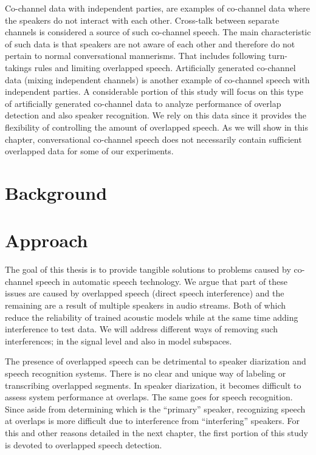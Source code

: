Co-channel data with independent parties, are examples of co-channel data where the speakers do not interact with each other. 
Cross-talk between separate channels is considered a source of such co-channel speech. 
The main characteristic of such data is that speakers are not aware of each other and therefore do not pertain to normal conversational mannerisms. 
That includes following turn-takings rules and limiting overlapped speech. 
Artificially generated co-channel data (mixing independent channels) is another example of co-channel speech with independent parties. 
A considerable portion of this study will focus on this type of artificially generated co-channel data to analyze performance of overlap detection and also speaker recognition. 
We rely on this data since it provides the flexibility of controlling the amount of overlapped speech. 
As we will show in this chapter, conversational co-channel speech does not necessarily contain sufficient overlapped data for some of our experiments. 

\section{Background}
\label{sec:background}



\section{Approach}

The goal of this thesis is to provide tangible solutions to problems caused by co-channel speech in automatic speech technology. 
We argue that part of these issues are caused by overlapped speech (direct speech interference) and the remaining are a result of multiple speakers in audio streams. 
Both of which reduce the reliability of trained acoustic models while at the same time adding interference to test data. 
We will address different ways of removing such interferences; in the signal level and also in model subspaces. 

The presence of overlapped speech can be detrimental to speaker diarization and speech recognition systems. 
There is no clear and unique way of labeling or transcribing overlapped segments. 
In speaker diarization, it becomes difficult to assess system performance at overlaps. 
The same goes for speech recognition. 
Since aside from determining which is the ``primary'' speaker, recognizing speech at overlaps is more difficult due to interference from ``interfering'' speakers. 
For this and other reasons detailed in the next chapter, the first portion of this study is devoted to overlapped speech detection. 
